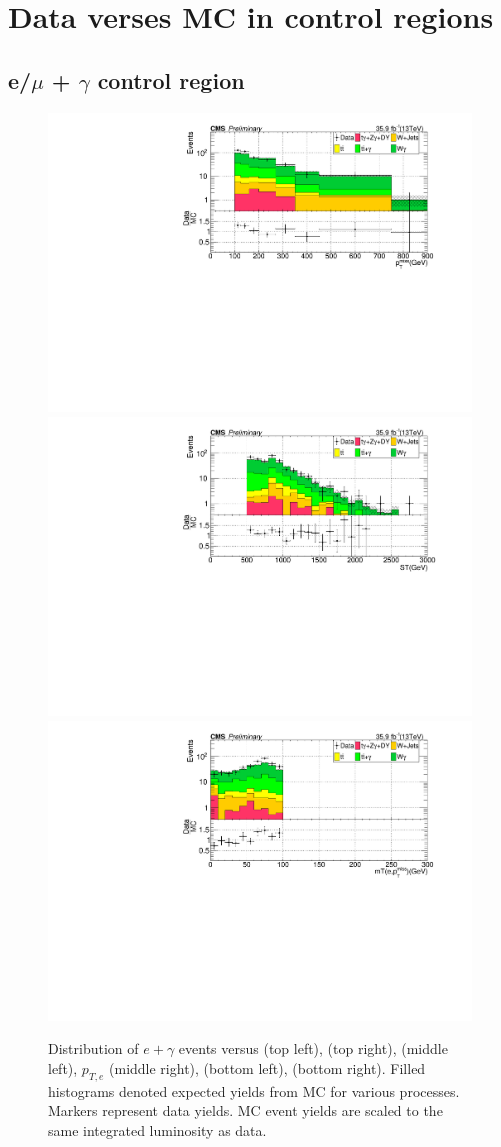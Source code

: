 \chapter{Data verses MC in control regions} %

\label{AppendixC}
\section{e/$\mu$ + $\gamma$ control region}
\begin{figure}[h!]
\centering
\caption{Distribution of $e+\gamma$ events versus \ptmiss (top left), \ST (top right), 
\mt (middle left), $p_{T,e}$ (middle right), \nj (bottom left), \nb (bottom right).  
Filled histograms denoted expected yields from MC for various processes.  Markers represent data yields.
MC event yields are scaled to the same integrated luminosity as data.}
\label{fig:lost_e_CR_dist}
\includegraphics[width=0.48\linewidth]{../Figures/Chap3/lost_lepton/METvarBin_Ele1.pdf}
\includegraphics[width=0.48\linewidth]{../Figures/Chap3/lost_lepton/ST_Ele1.pdf}\\
\includegraphics[width=0.48\linewidth]{../Figures/Chap3/lost_lepton/MT_Ele.pdf}

\end{figure}
